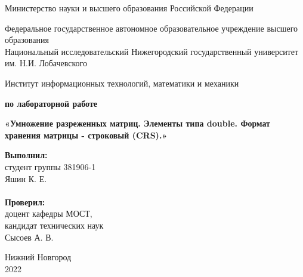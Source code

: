 \documentclass{report}
\begin{document}
\begin{titlepage}

\begin{center}
Министерство науки и высшего образования Российской Федерации
\end{center}

\begin{center}
Федеральное государственное автономное образовательное учреждение высшего образования \\
Национальный исследовательский Нижегородский государственный университет им. Н.И. Лобачевского
\end{center}

\begin{center}
Институт информационных технологий, математики и механики
\end{center}

\vspace{4em}

\begin{center}
\textbf{ по лабораторной работе} \\
\end{center}
\begin{center}
\textbf{\Large«Умножение разреженных матриц. Элементы типа double. Формат хранения матрицы - строковый (CRS).»} \\
\end{center}

\vspace{4em}

\newbox{\lbox}
\newlength{\maxl}
\setlength{\maxl}{\wd\lbox}
\hfill\parbox{7cm}{
\hspace*{5cm}\hspace*{-5cm}\textbf{Выполнил:} \\ студент группы 381906-1 \\ Яшин К. Е.\\
\\
\hspace*{5cm}\hspace*{-5cm}\textbf{Проверил:}\\ доцент кафедры МОСТ, \\ кандидат технических наук \\ Сысоев А. В.\\
}
\vspace{\fill}

\begin{center} Нижний Новгород \\ 2022 \end{center}

\end{titlepage}
\end{document}
